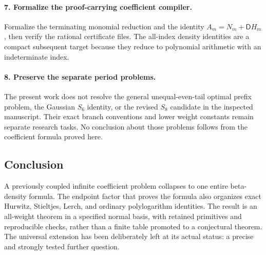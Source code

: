 \documentclass[11pt]{article}
\numberwithin{equation}{section}
\theoremstyle{definition}\newtheorem{definition}[theorem]{Definition}
\theoremstyle{remark}\newtheorem{remark}[theorem]{Remark}
\newcommand{\D}{\mathsf D}\newcommand{\Euler}{\mathscr E}
\begin{document}
\paragraph{7. Formalize the proof-carrying coefficient compiler.}
Formalize the terminating monomial reduction and the identity
$A_m=N_m+\D H_m$, then verify the rational certificate files. The
all-index density identities are a compact subsequent target because they
reduce to polynomial arithmetic with an indeterminate index.

\paragraph{8. Preserve the separate period problems.}
The present work does not resolve the general unequal-even-tail optimal
prefix problem, the Gaussian $S_6$ identity, or the revised $S_8$ candidate
in the inspected manuscript. Their exact branch conventions and lower
weight constants remain separate research tasks. No conclusion about
those problems follows from the coefficient formula proved here.

\subsection*{Conclusion}
A previously coupled infinite coefficient problem collapses to one entire
beta-density formula. The endpoint factor that proves the formula also
organizes exact Hurwitz, Stieltjes, Lerch, and ordinary polylogarithm
identities. The result is an all-weight theorem in a specified normal
basis, with retained primitives and reproducible checks, rather than a
finite table promoted to a conjectural theorem. The universal extension
has been deliberately left at its actual status: a precise and strongly
tested further question.

\end{document}
